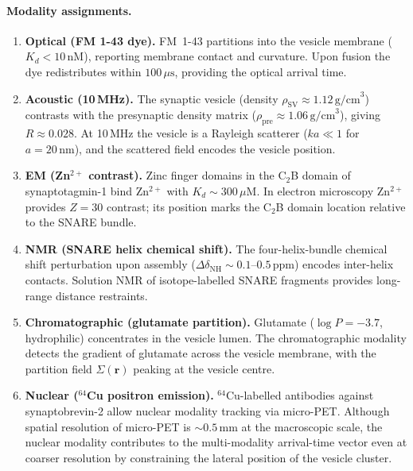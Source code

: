 \paragraph{Modality assignments.}
\begin{enumerate}[label=(\arabic*),leftmargin=2em]
\item \textbf{Optical (FM 1-43 dye).}  FM~1-43 partitions into the vesicle
  membrane ($K_d < 10\,\text{nM}$), reporting membrane contact and
  curvature.  Upon fusion the dye redistributes within $100\,\mu\text{s}$,
  providing the optical arrival time.

\item \textbf{Acoustic (10\,MHz).}  The synaptic vesicle (density
  $\rho_\text{SV} \approx 1.12\,\text{g/cm}^3$) contrasts with the
  presynaptic density matrix ($\rho_\text{pre} \approx 1.06\,\text{g/cm}^3$),
  giving $R \approx 0.028$.  At 10\,MHz the vesicle is a Rayleigh scatterer
  ($ka \ll 1$ for $a = 20\,\text{nm}$), and the scattered field encodes the
  vesicle position.

\item \textbf{EM (Zn$^{2+}$ contrast).}  Zinc finger domains in the
  C$_2$B domain of synaptotagmin-1 bind Zn$^{2+}$ with $K_d \sim 300\,\mu\text{M}$.
  In electron microscopy Zn$^{2+}$ provides $Z = 30$ contrast; its position
  marks the C$_2$B domain location relative to the SNARE bundle.

\item \textbf{NMR (SNARE helix chemical shift).}  The four-helix-bundle
  chemical shift perturbation upon assembly ($\Delta\delta_\text{NH}
  \sim 0.1$--$0.5\,\text{ppm}$) encodes inter-helix contacts.  Solution
  NMR of isotope-labelled SNARE fragments provides long-range distance
  restraints.

\item \textbf{Chromatographic (glutamate partition).}  Glutamate
  ($\log P = -3.7$, hydrophilic) concentrates in the vesicle lumen.
  The chromatographic modality detects the gradient of glutamate
  across the vesicle membrane, with the partition field $\Sigma(\mathbf{r})$
  peaking at the vesicle centre.

\item \textbf{Nuclear ($^{64}$Cu positron emission).}  $^{64}$Cu-labelled
  antibodies against synaptobrevin-2 allow nuclear modality tracking via
  micro-PET.  Although spatial resolution of micro-PET is $\sim 0.5\,\text{mm}$
  at the macroscopic scale, the nuclear modality contributes to the
  multi-modality arrival-time vector even at coarser resolution by constraining
  the lateral position of the vesicle cluster.
\end{enumerate}

